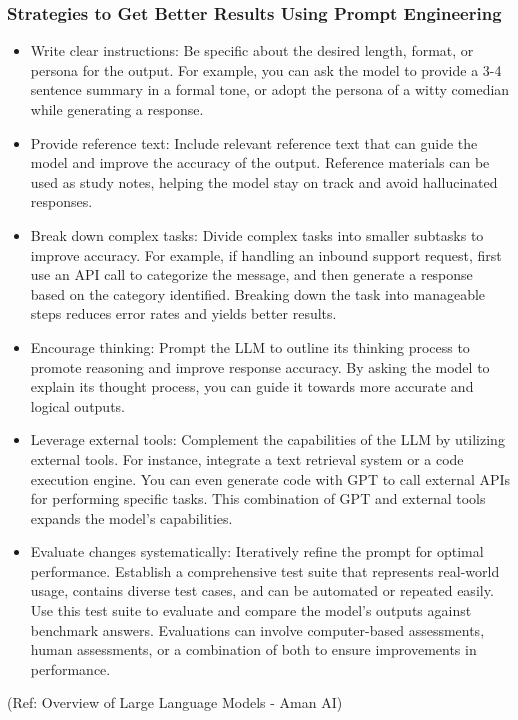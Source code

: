 \begin{frame}[fragile]\frametitle{Strategies to Get Better Results Using Prompt Engineering}

\begin{itemize}
\item Write clear instructions: Be specific about the desired length, format, or persona for the output. For example, you can ask the model to provide a 3-4 sentence summary in a formal tone, or adopt the persona of a witty comedian while generating a response.
\item Provide reference text: Include relevant reference text that can guide the model and improve the accuracy of the output. Reference materials can be used as study notes, helping the model stay on track and avoid hallucinated responses.
\item Break down complex tasks: Divide complex tasks into smaller subtasks to improve accuracy. For example, if handling an inbound support request, first use an API call to categorize the message, and then generate a response based on the category identified. Breaking down the task into manageable steps reduces error rates and yields better results.
\item Encourage thinking: Prompt the LLM to outline its thinking process to promote reasoning and improve response accuracy. By asking the model to explain its thought process, you can guide it towards more accurate and logical outputs.
\item Leverage external tools: Complement the capabilities of the LLM by utilizing external tools. For instance, integrate a text retrieval system or a code execution engine. You can even generate code with GPT to call external APIs for performing specific tasks. This combination of GPT and external tools expands the model's capabilities.
\item Evaluate changes systematically: Iteratively refine the prompt for optimal performance. Establish a comprehensive test suite that represents real-world usage, contains diverse test cases, and can be automated or repeated easily. Use this test suite to evaluate and compare the model's outputs against benchmark answers. Evaluations can involve computer-based assessments, human assessments, or a combination of both to ensure improvements in performance.
\end{itemize}

{\tiny (Ref: Overview of Large Language Models - Aman AI)}

\end{frame}

